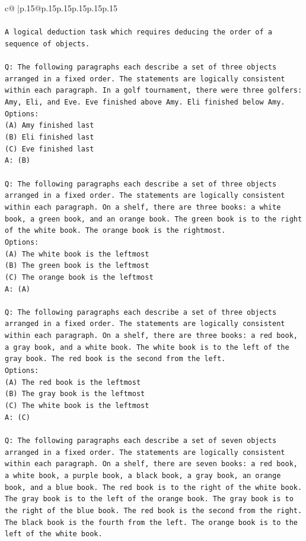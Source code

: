 \documentclass{article}
\begin{document}
{\begin{supertabular}{c@{$\;$}|p{.15\linewidth}@{}p{.15\linewidth}p{.15\linewidth}p{.15\linewidth}p{.15\linewidth}p{.15\linewidth}}
{{{\\ 
\\ 
\texttt{A logical deduction task which requires deducing the order of a sequence of objects.} \\
\\ 
\texttt{Q: The following paragraphs each describe a set of three objects arranged in a fixed order. The statements are logically consistent within each paragraph. In a golf tournament, there were three golfers: Amy, Eli, and Eve. Eve finished above Amy. Eli finished below Amy.} \\
\texttt{Options:} \\
\texttt{(A) Amy finished last} \\
\texttt{(B) Eli finished last} \\
\texttt{(C) Eve finished last} \\
\texttt{A: (B)} \\
\\ 
\texttt{Q: The following paragraphs each describe a set of three objects arranged in a fixed order. The statements are logically consistent within each paragraph. On a shelf, there are three books: a white book, a green book, and an orange book. The green book is to the right of the white book. The orange book is the rightmost.} \\
\texttt{Options:} \\
\texttt{(A) The white book is the leftmost} \\
\texttt{(B) The green book is the leftmost} \\
\texttt{(C) The orange book is the leftmost} \\
\texttt{A: (A)} \\
\\ 
\texttt{Q: The following paragraphs each describe a set of three objects arranged in a fixed order. The statements are logically consistent within each paragraph. On a shelf, there are three books: a red book, a gray book, and a white book. The white book is to the left of the gray book. The red book is the second from the left.} \\
\texttt{Options:} \\
\texttt{(A) The red book is the leftmost} \\
\texttt{(B) The gray book is the leftmost} \\
\texttt{(C) The white book is the leftmost} \\
\texttt{A: (C)} \\
\\ 
\texttt{Q: The following paragraphs each describe a set of seven objects arranged in a fixed order. The statements are logically consistent within each paragraph. On a shelf, there are seven books: a red book, a white book, a purple book, a black book, a gray book, an orange book, and a blue book. The red book is to the right of the white book. The gray book is to the left of the orange book. The gray book is to the right of the blue book. The red book is the second from the right. The black book is the fourth from the left. The orange book is to the left of the white book.} \\
}}}
\end{supertabular}}
\end{document}
